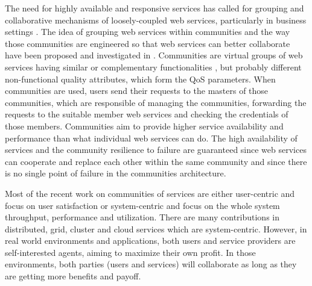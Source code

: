 \documentclass[10pt,journal,cspaper,compsoc]{IEEEtran}
\begin{document}
The need for highly available and responsive services has called
for grouping and collaborative mechanisms of loosely-coupled web
services, particularly in business settings
\cite{YuB13,Younas2012,LiuBWZ13}. The idea of grouping web
services within communities and the way those communities are
engineered so that web services can better collaborate have been
proposed and investigated in
\cite{DBLP:journals/ijebr/MaamarSTBB09,DBLP:journals/internet/BenatallahSD03,Rosario:2008:PQS:1512146.1512290}.
Communities are virtual groups of web services having similar or
complementary functionalities \cite{Zeng:2003:QDW:775152.775211,
Paik:2005:TSS:2229263.2230038,Medjahed05adynamic,10.1109/ARES.2008.7},
but probably different non-functional quality attributes, which
form the QoS parameters. When communities are used, users send
their requests to the masters of those communities, which are
responsible of managing the communities, forwarding the requests
to the suitable member web services and checking the credentials
of those members. Communities aim to provide higher service
availability and performance than what individual web services can
do. The high availability of services and the community resilience
to failure are guaranteed since web services can cooperate and
replace each other within the same community and since there is no
single point of failure in the communities architecture.

Most of the recent work on communities of services are either
user-centric and focus on user satisfaction
\cite{Chun02user-centricperformance} or system-centric and focus
on the whole system throughput, performance and utilization. There
are many contributions in distributed, grid, cluster and cloud
services which are system-centric. However, in real world
environments and applications, both users and service providers
are self-interested agents, aiming to maximize their own profit.
In those environments, both parties (users and services) will
collaborate as long as they are getting more benefits and payoff.
\end{document}
